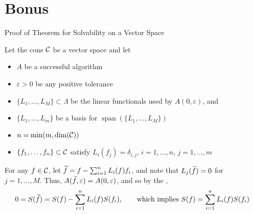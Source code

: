\documentclass[11pt,compress,xcolor={usenames,dvipsnames},aspectratio=169]{beamer}
\DeclareMathOperator{\spann}{span}
\begin{document}
\thankyouframe

\printbibliography

\section{Bonus}
\begin{frame}[label = VectorSpaceThmProof]{Proof of Theorem for Solvability on a Vector Space}

\vspace{-3ex}

Let the cone $\mathcal{C}$ be a \alert{vector space} and let

\vspace{-3ex}
\begin{itemize}
    \item $A$ be a successful algorithm
    
    \item $\varepsilon > 0$ be any positive tolerance
    
    \item  $\{L_1, \ldots, L_{M}\} \subset \Lambda$ be the linear functionals used by $A(0,\varepsilon)$, and
    
    \item  $\{L_1, \ldots, L_m\}$ be a basis for $\spann(\{L_1, \ldots, L_{M}\})$
    
    \item $n  = \min(m,\dim(\mathcal{C}))$
    
        \item $\{f_1, \ldots, f_n\} \subset \mathcal{C}$ satisfy $L_i(f_j) = \delta_{i,j}$, $i =1, \ldots, n$, $j=1, \ldots, m$
\end{itemize}

\vspace{-2ex}

For any $f \in \mathcal{C}$, let $\widetilde{f} = f- \sum_{i=1}^n L_i(f) f_i$, and note that $L_j(\widetilde{f}) = 0$ for $j =1, \ldots, M$.  Thus, $A(\widetilde{f},\varepsilon) = A(0,\varepsilon)$, and so by the \hyperlink{ZeroCorollary}{},
\[
0 = S(\widetilde{f}) = S(f) - \sum_{i=1}^n L_i(f) S(f_i), \qquad \text{which implies } S(f) = \sum_{i=1}^n L_i(f) S(f_i)
\]

\vspace{-3ex}
    \hyperlink{VectorSpaceThm}{}
\end{frame}
\end{document}
